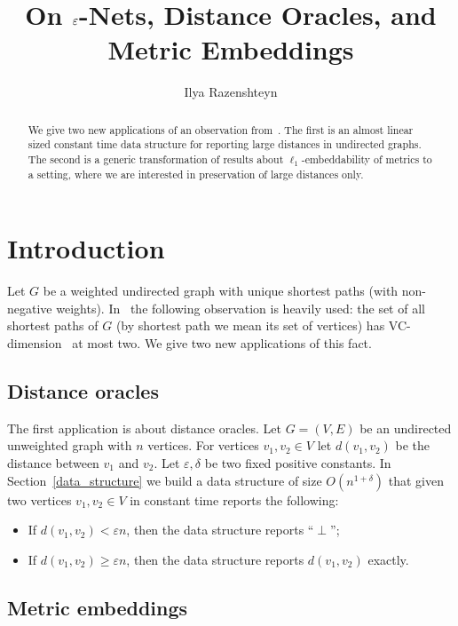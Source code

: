 \documentclass{article}
\title{On $\eps$-Nets, Distance Oracles, and Metric Embeddings}
\author{Ilya Razenshteyn}
\date{}
\newcommand{\eps}{\varepsilon}
\begin{document}
    \maketitle
    \begin{abstract}
        We give two new applications of an observation from~\cite{ADFGW11}.
        The first is an almost linear sized constant time data structure for reporting large distances in undirected graphs.
        The second is a generic transformation of results about $\ell_1$-embeddability of metrics to a setting,
        where we are interested in preservation of large distances only.
    \end{abstract}
    \section{Introduction}

    Let $G$ be a weighted undirected graph with unique shortest paths (with non-negative weights).
    In~\cite{ADFGW11} the following observation is heavily used: the set of all shortest paths of $G$ (by shortest path we mean its set of vertices)
    has VC-dimension~\cite{VC71} at most two.
    We give two new applications of this fact.

    \subsection{Distance oracles}

    The first application is about distance oracles.
    Let $G = (V, E)$ be an undirected unweighted graph with $n$ vertices.
    For vertices $v_1, v_2 \in V$ let $d(v_1, v_2)$ be the distance between $v_1$ and $v_2$.
    Let $\eps, \delta$ be two fixed positive constants.
    In Section~\ref{data_structure}
    we build a data structure of size $O(n^{1 + \delta})$ that given two vertices $v_1, v_2 \in V$ in constant time reports the following:
    \begin{itemize}
        \item If $d(v_1, v_2) < \eps n$, then the data structure reports ``$\perp$'';
        \item If $d(v_1, v_2) \geq \eps n$, then the data structure reports $d(v_1, v_2)$ exactly.
    \end{itemize}

    \subsection{Metric embeddings}
\end{document}
